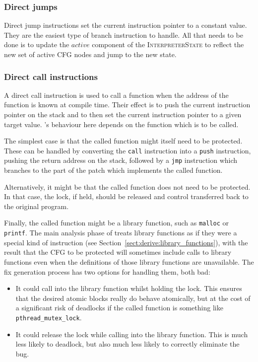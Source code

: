 \subsubsection{Direct jumps}

 Direct jump
instructions set the current instruction pointer to a constant value.
They are the easiest type of branch instruction to handle.  All that
needs to be done is to update the $\mathit{active}$ component of the
\textsc{InterpreterState} to reflect the new set of active CFG nodes
and jump to the new state.

\subsubsection{Direct call instructions}

A direct call instruction is used to call a function when the address
of the function is known at compile time.  Their effect is to push the
current instruction pointer on the stack and to then set the current
instruction pointer to a given target value.  {\Implementation}'s
behaviour here depends on the function which is to be called.

The simplest case is that the called function might itself need to be
protected.  These can be handled by converting the \texttt{call}
instruction into a \texttt{push} instruction, pushing the return
address on the stack, followed by a \texttt{jmp} instruction which
branches to the part of the patch which implements the called
function.

Alternatively, it might be that the called function does not need to
be protected.  In that case, the lock, if held, should be released and
control transferred back to the original program.

Finally, the called function might be a library function, such as
\texttt{malloc} or \texttt{printf}.  The main analysis
phase of {\technique} treats library functions as if they were a
special kind of instruction (see
Section~\ref{sect:derive:library_functions}), with the result that the CFG to be
protected will sometimes include calls to library functions even when
the definitions of those library functions are unavailable.  The fix
generation process has two options for handling them, both bad:

\begin{itemize}
\item It could call into the library function whilst holding the lock.
  This ensures that the desired atomic blocks really do behave
  atomically, but at the cost of a significant risk of deadlocks if
  the called function is something like \texttt{pthread\_mutex\_lock}.
\item It could release the lock while calling into the library
  function.  This is much less likely to deadlock, but also much
  less likely to correctly eliminate the bug.
\end{itemize}

